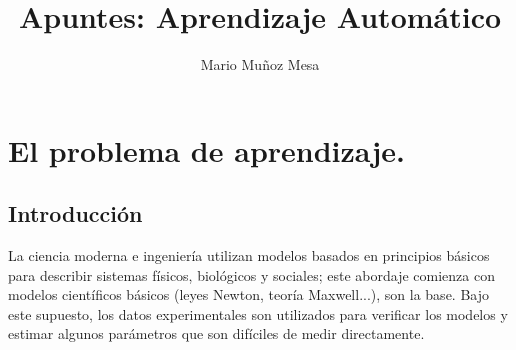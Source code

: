 \documentclass[11pt,a4paper]{article}
\title{\huge \bf Apuntes: Aprendizaje Automático}
\author{Mario Muñoz Mesa}
\date{ }
\theoremstyle{definition}
\begin{document}
	\maketitle
	\renewcommand*\contentsname{Índice}	
	\tableofcontents
	
	\newpage
	
	\section{El problema de aprendizaje.}
	\subsection{Introducción}
	La ciencia moderna e ingeniería utilizan modelos basados en principios básicos para describir sistemas físicos, biológicos y sociales; este abordaje comienza con modelos científicos básicos (leyes Newton, teoría Maxwell...), son la base. Bajo este supuesto, los datos experimentales son utilizados para verificar los modelos y estimar algunos parámetros que son difíciles de medir directamente. 
	
\end{document}
